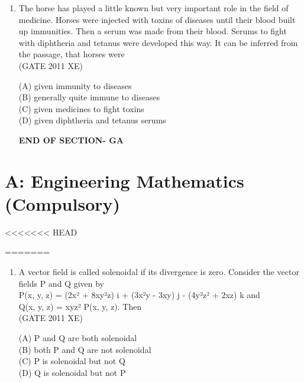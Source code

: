 \documentclass[journal,12pt,onecolumn]{IEEEtran}
\begin{document}
\begin{enumerate}
\begin{enumerate}[label=\textbf{Q\arabic*.},itemsep=2em]
\item The horse has played a little known but very important role in the field of medicine. Horses were injected with toxins of diseases until their blood built up immunities. Then a serum was made from their blood. Serums to fight with diphtheria and tetanus were developed this way. It can be inferred from the passage, that horses were \\

\hfill{(GATE 2011 XE)} \\
\begin{multicols}{4}
(A) given immunity to diseases \\
(B) generally quite immune to diseases \\
(C) given medicines to fight toxins \\
(D) given diphtheria and tetanus serums
\end{multicols}


\vspace{3\baselineskip}
    \begin{center}
    \textbf{\Large END OF SECTION- GA}
    \end{center}
    
\end{enumerate}

\clearpage
\section*{A: Engineering Mathematics (Compulsory)}
<<<<<<< HEAD
\begin{enumerate}
\bigskip
=======
\begin{enumerate}[label=\textbf{Q\arabic*.},itemsep=2em]
\vspace{1cm}
>>>>>>> d734831 (Assignment)

\item A vector field is called solenoidal if its divergence is zero. Consider the vector fields P and Q given by \\
P(x, y, z) = (2x² + 8xy²z) i + (3x²y - 3xy) j - (4y²z² + 2xz) k and \\
Q(x, y, z) = xyz² P(x, y, z). Then \\

\hfill{(GATE 2011 XE)} \\
\begin{multicols}{2}
(A) P and Q are both solenoidal \\
(B) both P and Q are not solenoidal \\
(C) P is solenoidal but not Q \\
(D) Q is solenoidal but not P
\end{multicols}


\end{enumerate}
\end{enumerate}
\end{enumerate}
\end{document}
